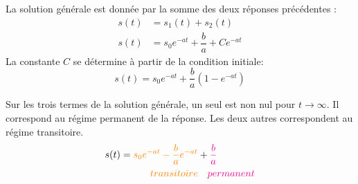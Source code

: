 La solution générale est donnée par la somme des deux réponses précédentes :
\begin{align*}
    s(t)&=s_1(t)+s_2(t)\\
    s(t)&=s_0e^{-at}+\dfrac{b}{a}+Ce^{-at}
\end{align*}
La constante $C$ se détermine à partir de la condition initiale:
$$
s(t)=s_0e^{-at}+\dfrac{b}{a}\left(1-e^{-at}\right)
$$
\begin{center}
{\tikzset{external/export=false}       
        }
\end{center}

Sur les trois termes de la solution générale, un seul est non
nul pour $t\to\infty$. Il correspond au régime permanent de
la réponse. Les deux autres correspondent au régime transitoire.
\begin{align*}
    s(t)=\textcolor{orange}{s_0e^{-at}-\dfrac{b}{a}e^{-at}}&+\textcolor{magenta}{\dfrac{b}{a}}\\
    \textcolor{orange}{transitoire} &\quad\textcolor{magenta}{permanent}
\end{align*}
